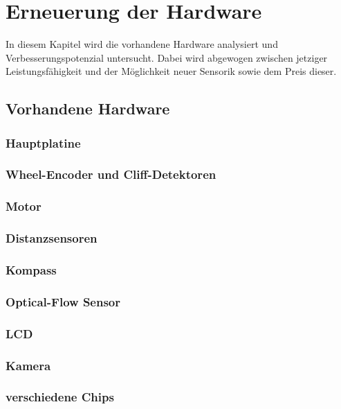 \documentclass[a4paper,cleardoubleempty,BCOR1cm]{book}
\begin{document}
\section{Erneuerung der Hardware}
In diesem Kapitel wird die vorhandene Hardware analysiert und Verbesserungspotenzial untersucht. Dabei wird abgewogen zwischen jetziger Leistungsfähigkeit und der Möglichkeit neuer Sensorik sowie dem Preis dieser. 

\subsection{Vorhandene Hardware}

\subsubsection{Hauptplatine}

\subsubsection{Wheel-Encoder und Cliff-Detektoren}

\subsubsection{Motor}

\subsubsection{Distanzsensoren}

\subsubsection{Kompass}

\subsubsection{Optical-Flow Sensor}


\subsubsection{LCD}

\subsubsection{Kamera}

\subsubsection{verschiedene Chips}
\end{document}
